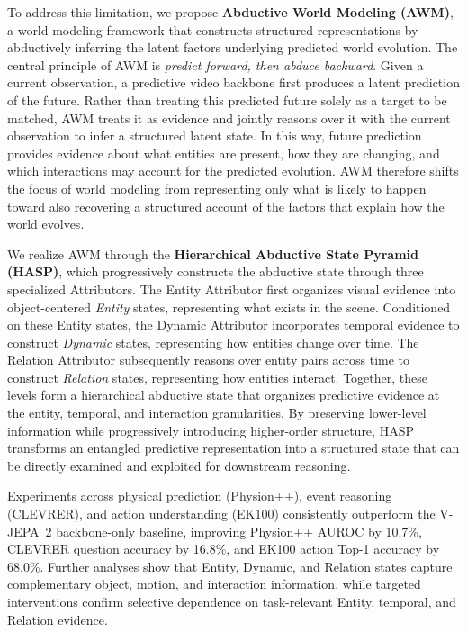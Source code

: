 \documentclass{article}
\newcommand{\vjepa}{V-JEPA~2}
\begin{document}
To address this limitation, we propose \textbf{Abductive World Modeling (AWM)}, a world modeling framework that constructs structured representations by abductively inferring the latent factors underlying predicted world evolution.
The central principle of AWM is \emph{predict forward, then abduce backward}.
Given a current observation, a predictive video backbone first produces a latent prediction of the future.
Rather than treating this predicted future solely as a target to be matched, AWM treats it as evidence and jointly reasons over it with the current observation to infer a structured latent state.
In this way, future prediction provides evidence about what entities are present, how they are changing, and which interactions may account for the predicted evolution.
AWM therefore shifts the focus of world modeling from representing only what is likely to happen toward also recovering a structured account of the factors that explain how the world evolves.

We realize AWM through the \textbf{Hierarchical Abductive State Pyramid (HASP)}, which progressively constructs the abductive state through three specialized Attributors.
The Entity Attributor first organizes visual evidence into object-centered \textit{Entity} states, representing what exists in the scene.
Conditioned on these Entity states, the Dynamic Attributor incorporates temporal evidence to construct \textit{Dynamic} states, representing how entities change over time.
The Relation Attributor subsequently reasons over entity pairs across time to construct \textit{Relation} states, representing how entities interact.
Together, these levels form a hierarchical abductive state that organizes predictive evidence at the entity, temporal, and interaction granularities.
By preserving lower-level information while progressively introducing higher-order structure, HASP transforms an entangled predictive representation into a structured state that can be directly examined and exploited for downstream reasoning.

Experiments across physical prediction (Physion++), event reasoning (CLEVRER), and action understanding (EK100) consistently outperform the \vjepa{} backbone-only baseline, improving Physion++ AUROC by 10.7\%, CLEVRER question accuracy by 16.8\%, and EK100 action Top-1 accuracy by 68.0\%. Further analyses show that Entity, Dynamic, and Relation states capture complementary object, motion, and interaction information, while targeted interventions confirm selective dependence on task-relevant Entity, temporal, and Relation evidence.
\end{document}
